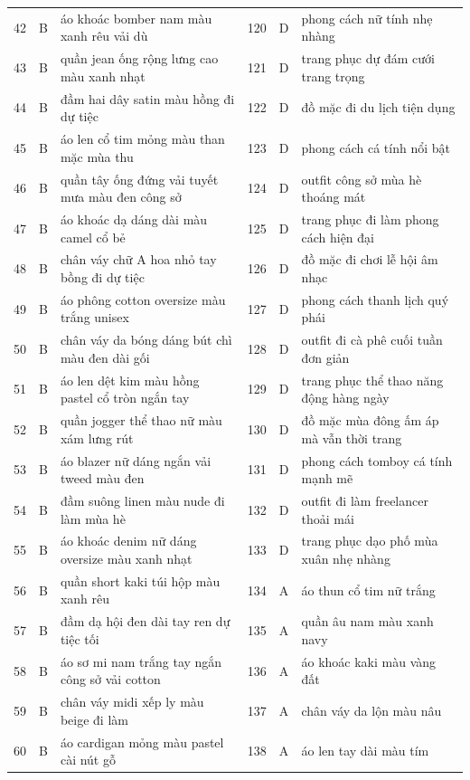 \begin{longtable}{@{}r c p{5.7cm} r c p{5.7cm}@{}}
42 & B & áo khoác bomber nam màu xanh rêu vải dù & 120 & D & phong cách nữ tính nhẹ nhàng \\
43 & B & quần jean ống rộng lưng cao màu xanh nhạt & 121 & D & trang phục dự đám cưới trang trọng \\
44 & B & đầm hai dây satin màu hồng đi dự tiệc & 122 & D & đồ mặc đi du lịch tiện dụng \\
45 & B & áo len cổ tim mỏng màu than mặc mùa thu & 123 & D & phong cách cá tính nổi bật \\
46 & B & quần tây ống đứng vải tuyết mưa màu đen công sở & 124 & D & outfit công sở mùa hè thoáng mát \\
47 & B & áo khoác dạ dáng dài màu camel cổ bẻ & 125 & D & trang phục đi làm phong cách hiện đại \\
48 & B & chân váy chữ A hoa nhỏ tay bồng đi dự tiệc & 126 & D & đồ mặc đi chơi lễ hội âm nhạc \\
49 & B & áo phông cotton oversize màu trắng unisex & 127 & D & phong cách thanh lịch quý phái \\
50 & B & chân váy da bóng dáng bút chì màu đen dài gối & 128 & D & outfit đi cà phê cuối tuần đơn giản \\
51 & B & áo len dệt kim màu hồng pastel cổ tròn ngắn tay & 129 & D & trang phục thể thao năng động hàng ngày \\
52 & B & quần jogger thể thao nữ màu xám lưng rút & 130 & D & đồ mặc mùa đông ấm áp mà vẫn thời trang \\
53 & B & áo blazer nữ dáng ngắn vải tweed màu đen & 131 & D & phong cách tomboy cá tính mạnh mẽ \\
54 & B & đầm suông linen màu nude đi làm mùa hè & 132 & D & outfit đi làm freelancer thoải mái \\
55 & B & áo khoác denim nữ dáng oversize màu xanh nhạt & 133 & D & trang phục dạo phố mùa xuân nhẹ nhàng \\
56 & B & quần short kaki túi hộp màu xanh rêu & 134 & A & áo thun cổ tim nữ trắng \\
57 & B & đầm dạ hội đen dài tay ren dự tiệc tối & 135 & A & quần âu nam màu xanh navy \\
58 & B & áo sơ mi nam trắng tay ngắn công sở vải cotton & 136 & A & áo khoác kaki màu vàng đất \\
59 & B & chân váy midi xếp ly màu beige đi làm & 137 & A & chân váy da lộn màu nâu \\
60 & B & áo cardigan mỏng màu pastel cài nút gỗ & 138 & A & áo len tay dài màu tím \\

\end{longtable}
